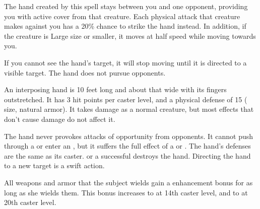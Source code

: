 \spellrng{\rngmed}
\begin{spelleffect}
  The hand created by this spell stays between you and one opponent, providing you with active cover from that creature. Each physical attack that creature makes against you has a 20\% chance to strike the hand instead. In addition, if the creature is Large size or smaller, it moves at half speed while moving towards you. 
  \par If you cannot see the hand's target, it will stop moving until it is directed to a visible target. The hand does not pursue opponents.
  \par An interposing hand is 10 feet long and about that wide with its fingers outstretched. It has 3 hit points per caster level, and a physical defense of 15 ( size,  natural armor). It takes damage as a normal creature, but most effects that don't cause damage do not affect it.
\end{spelleffect}
\begin{spellnotes}
  \par The hand never provokes attacks of opportunity from opponents. It cannot push through a  or enter an , but it suffers the full effect of a  or . The hand's defenses are the same as its caster.
   or a successful  destroys the hand. Directing the hand to a new target is a swift action.
\end{spellnotes}

\spellrng{\rngclose}
\spelldur{\durshort}
\begin{spelleffect}
  All weapons and armor that the subject wields gain a  enhancement bonus for as long as she wields them. This bonus increases to  at 14th caster level, and to  at 20th caster level.
\end{spelleffect}

